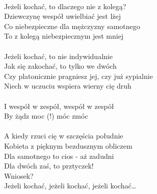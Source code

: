 \documentclass[a5paper, 10pt]{book}
\begin{document}
\begin{minipage}[t]{0.8\textwidth}
\\
Jeżeli kochać, to dlaczego nie z kolegą?\\
Dziewczynę wespół uwielbiać jest lżej\\
Co niebezpieczne dla mężczyzny samotnego\\
To z kolegą niebezpiecznym jest mniej\\
\\
Jeżeli kochać, to nie indywidualnie\\
Jak się zakochać, to tylko we dwóch\\
Czy platonicznie pragniesz jej, czy już sypialnie\\
Niech w uczuciu wspiera wierny cię druh\\
\\
\hspace*{8mm}I wespół w zespół, wespół w zespół\\
\hspace*{8mm}By żądz moc (!) móc zmóc\\
\\
A kiedy rzuci cię w szczęścia południe\\
Kobieta z pięknym bezdusznym obliczem\\
Dla samotnego to cios - aż zadudni\\
Dla dwóch zaś, to prztyczek!\\

\hspace*{4mm}Wniosek?\\
\hspace*{4mm}Jeżeli kochać, jeżeli kochać, jeżeli kochać… \\
\end{minipage}
\end{document}
